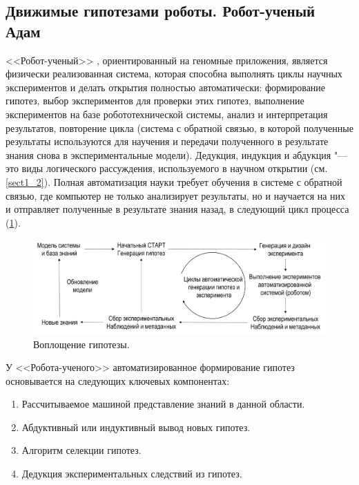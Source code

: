 \subsection{Движимые гипотезами роботы. Робот-ученый Адам}\label{sect1_3_1}
<<Робот-ученый>> \cite{king2009automation, sparkes2010towards}, ориентированный на геномные приложения, 
является физически реализованная система, которая способна выполнять циклы научных экспериментов и делать 
открытия полностью автоматически: формирование гипотез, выбор экспериментов для проверки этих гипотез, выполнение 
экспериментов на базе робототехнической системы, анализ и интерпретация результатов, повторение цикла (система с 
обратной связью, в которой полученные результаты используются для научения и передачи полученного в результате знания 
снова в экспериментальные модели). Дедукция, индукция и абдукция "--- это виды логического рассуждения, используемого 
в научном открытии (см. \cref{sect1_2}). Полная автоматизация науки требует обучения в системе с обратной связью, где 
компьютер не только анализирует результаты, но и научается на них и отправляет полученные в результате знания назад, 
в следующий цикл процесса (\cref{fig:RobotScientistCycle}).

\begin{figure}[ht]
    \centering
    \includegraphics[width=1.0\linewidth]{images/RobotScientistCycle.pdf}
    \caption{Воплощение гипотезы.}\label{fig:RobotScientistCycle}
\end{figure}

У <<Робота-ученого>> автоматизированное формирование гипотез основывается на следующих ключевых компонентах:

\begin{enumerate}
    \item Рассчитываемое машиной представление знаний в данной области.
    \item Абдуктивный или индуктивный вывод новых гипотез.
    \item Алгоритм селекции гипотез.
    \item Дедукция экспериментальных следствий из гипотез.
\end{enumerate}	

